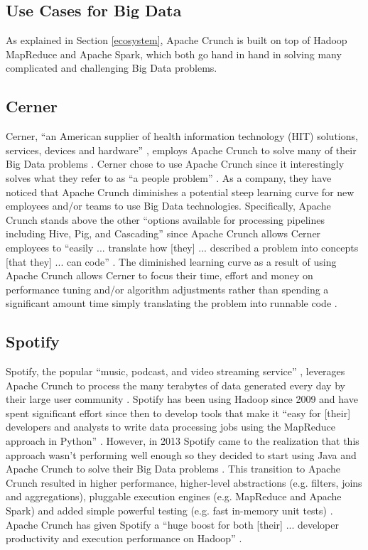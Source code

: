\documentclass[9pt,twocolumn,twoside]{../../styles/osajnl}
\begin{document}
\subsection{Use Cases for Big Data} \label{big}
As explained in Section \ref{ecosystem}, Apache Crunch is built on top
of Hadoop MapReduce and Apache Spark, which both go hand in hand in
solving many complicated and challenging Big Data problems.

\subsection{Cerner} \label{cerner}
Cerner, ``an American supplier of health information technology (HIT)
solutions, services, devices and hardware'' \cite{www-cerner}, employs
Apache Crunch to solve many of their Big Data problems
\cite{www-crunch-cerner}. Cerner chose to use Apache Crunch since it
interestingly solves what they refer to as ``a people problem''
\cite{www-crunch-cerner}. As a company, they have noticed that Apache
Crunch diminishes a potential steep learning curve for new employees
and/or teams to use Big Data technologies. Specifically, Apache Crunch
stands above the other ``options available for processing pipelines
including Hive, Pig, and Cascading'' since Apache Crunch allows Cerner
employees to ``easily ... translate how [they] ...
described a problem
into concepts [that they] ... can code'' \cite{www-crunch-cerner}. The
diminished learning curve as a result of using Apache Crunch allows
Cerner to focus their time, effort and money on performance tuning
and/or algorithm adjustments rather than spending a significant amount
time simply translating the problem into runnable code
\cite{www-crunch-cerner}.

\subsection{Spotify} \label{spotify}
Spotify, the popular ``music, podcast, and video streaming service''
\cite{www-spotify}, leverages Apache Crunch to process the many
terabytes of data generated every day by their large user community
\cite{www-crunch-spotify}. Spotify has been using Hadoop since 2009
and have spent significant effort since then to develop tools that
make it ``easy for [their] developers and analysts to write data
processing jobs using the MapReduce approach in Python''
\cite{www-crunch-spotify}. However, in 2013 Spotify came to the
realization that this approach wasn't performing well enough so they
decided to start using Java and Apache Crunch to solve their Big Data
problems \cite{www-crunch-spotify}. This transition to Apache Crunch
resulted in higher performance, higher-level abstractions (e.g.
filters, joins and aggregations), pluggable execution engines
(e.g. MapReduce and Apache Spark) and added simple powerful testing
(e.g. fast in-memory unit tests) \cite{www-crunch-spotify}. Apache
Crunch has given Spotify a ``huge boost for both [their] ... developer
productivity and execution performance on Hadoop''
\cite{www-crunch-spotify}.
\end{document}
